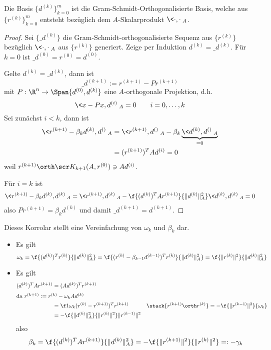 \documentclass[11pt]{scrbook}
\begin{document}
\begin{kor} \label{4.21}
	Die Basis $\{d^{(k)}\}_{k=0}^m$ ist die Gram-Schmidt-Orthogonalisierte Basis, welche aus $\{r^{(k)}\}_{k=0}^m$ entsteht bezüglich dem $A$-Skalarprodukt $\<\cdot,\cdot\>_A$.
	\begin{proof}
		Sei $\{\_d^{(k)}\}$ die Gram-Schmidt-orthogonalisierte Sequenz aus $\{r^{(k)}\}$ bezüglich $\<\cdot,\cdot\>_A$ aus $\{r^{(k)}\}$ generiert.
		Zeige per Induktion $d^{(k)} = \_d^{(k)}$.
		Für $k=0$ ist $\_d^{(0)} = r^{(0)} = d^{(0)}$.

		Gelte  $d^{(k)} = \_d^{(k)}$, dann ist
		\[
			\_d^{(k+1)} := r^{(k+1)} - Pr^{(k+1)}
		\]
		mit $P : \R^n \to \Span\{d^{(0)}, d^{(k)}\}$ eine $A$-orthogonale Projektion, d.h.
		\[
			\<x-Px, d^{(i)}\>_A = 0
			\qquad i = 0, \dotsc, k
		\]
		Sei zunächst $i<k$, dann ist
		\begin{align*}
			\< r^{(k+1)} - \beta_k d^{(k)}, d^{()} \>_A
			&= \< r^{(k+1)}, d^{()} \>_A - \beta_k \underbrace{\<d^{(k)}, d^{()} \>_A}_{=0} \\
			&= (r^{(k+1)})^T A d^{(i)}
			= 0
		\end{align*}
		weil $r^{(k+1)} \orth \scr K_{k+1} (A, r^{(0)}) \ni Ad^{(i)}$.

		Für $i = k$ ist
		\begin{align*}
			\<r^{(k+1)} - \beta_k d^{(k)}, d^{(k)}\>_A
			= \< r^{(k+1)}, d^{(k)}\>_A - \f{(d^{(k)})^T A r^{(k+1)}}{\|d^{(k)}\|_A^2} \<d^{(k)},d^{(k)}\>_A
			= 0
		\end{align*}
		also $P r^{(k+1)} = \beta_k d^{(k)}$ und damit $\_d^{(k+1)} = d^{(k+1)}$.
	\end{proof}
	\begin{note}
		Dieses Korrolar stellt eine Vereinfachung von $\omega_k$ und $\beta_k$ dar.
		\begin{itemize}
			\item
				Es gilt
				\[
					\omega_k = \f {(d^{(k)})^T r^{(k)}}{\|d^{(k)}\|_A^2} = \f {(r^{(k)}-\beta_{k-1}d^{(k-1)})^T r^{(k)}}{\|d^{(k)}\|_A^2} = \f{\|r^{(k)}\|^2}{\|d^{(k)}\|_A^2}
				\]
			\item
				Es gilt
				\begin{align*}
					(d^{(k)})^T A r^{(k+1)}
					&= (A d^{(k)})^T r^{(k+1)} \\
					\intertext{da $r^{(k+1)} := r^{(k)}-\omega_k A d^{(k)}$}
					&= \f 1{\omega_k} (r^{(k)} - r^{(k+1)})^T r^{(k+1)}
					&\stack{r^{(k+1)} \orth r^{(k)}} =   - \f {\|r^{(k-1)}\|^2}{\omega_k} \\
					&= - \f {\|d^{(k)}\|_A^2}{\|r^{(k)}\|^2} \|r^{(k-1)}\|^2
				\end{align*}
				also
				\[
					\beta_k = \f{(d^{(k)})^T A r^{(k+1)}}{\|d^{(k)}\|_A^2} = - \f{\|r^{(k+1)}\|^2}{\|r^{(k)}\|^2} =: - \gamma_k
				\]
		\end{itemize}
	\end{note}
\end{kor}
\end{document}
